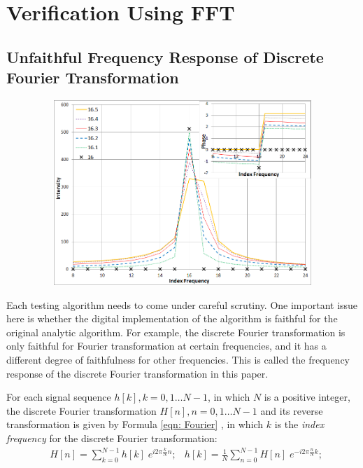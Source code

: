 \documentclass[twoside]{article}
\numberwithin{equation}{section}
\begin{document}
\clearpage
\section{Verification Using FFT}
\label{sec: FFT}


\subsection{Unfaithful Frequency Response of Discrete Fourier Transformation}

\begin{figure}%
\includegraphics[width=4.5in,height=2.75in]{FFT_Unfaithful.png} 
\label{fig: FFT_Unfaithful}
\end{figure}

Each testing algorithm needs to come under careful scrutiny.  
One important issue here is whether the digital implementation of the algorithm is faithful for the original analytic algorithm.  
For example, the discrete Fourier transformation is only faithful for Fourier transformation at certain frequencies, and it has a different degree of faithfulness for other frequencies.  
This is called the frequency response of the discrete Fourier transformation in this paper.

For each signal sequence $h[k], k = 0, 1 \dots  N-1$, in which $N$ is a positive integer, the discrete Fourier transformation $H[n], n = 0, 1 \dots  N-1$ and its reverse transformation is given by Formula \eqref{eqn: Fourier} \cite{Numerical_Recipes}, in which $k$ is the \emph{index frequency} for the discrete Fourier transformation:
\begin{align}
\label{eqn: Fourier}
& H[n]=\sum_{k=0}^{N-1}h[k] \; e^{i 2\pi \frac{k}{N} n};
& h[k]=\frac{1}{N} \sum_{n=0}^{N-1}H[n] \; e^{-i 2\pi \frac{n}{N} k};
\end{align}
\end{document}
